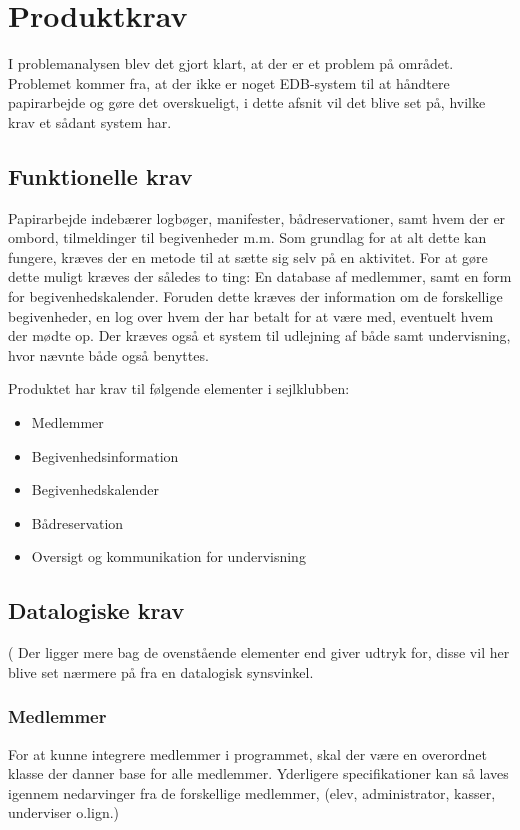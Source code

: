 \chapter{Produktkrav}
I problemanalysen blev det gjort klart, at der er et problem på området. Problemet kommer fra, at der ikke er noget EDB-system til at håndtere papirarbejde og gøre det overskueligt, i dette afsnit vil det blive set på, hvilke krav et sådant
system har.

\section{Funktionelle krav} \label{sec:funktionelleKrav}
Papirarbejde indebærer logbøger, manifester, bådreservationer, samt hvem der er ombord, tilmeldinger til begivenheder m.m.
Som grundlag for at alt dette kan fungere, kræves der en metode til at sætte sig selv på en aktivitet. For at gøre dette
muligt kræves der således to ting: En database af medlemmer, samt en form for begivenhedskalender. Foruden dette kræves
der information om de forskellige begivenheder, en log over hvem der har betalt for at være med, eventuelt hvem der
mødte op. Der kræves også et system til udlejning af både samt undervisning, hvor nævnte både også benyttes.

Produktet har krav til følgende elementer i sejlklubben:
\begin{itemize}
  \item Medlemmer
  \item Begivenhedsinformation
  \item Begivenhedskalender
  \item Bådreservation
  \item Oversigt og kommunikation for undervisning
\end{itemize}

\section{Datalogiske krav}(
Der ligger mere bag de ovenstående elementer end  giver udtryk for, disse vil her blive set nærmere på fra en datalogisk synsvinkel.
\subsection{Medlemmer}
For at kunne integrere medlemmer i programmet, skal der være en overordnet klasse der danner base for alle medlemmer. Yderligere specifikationer kan så laves igennem nedarvinger fra de forskellige medlemmer, (elev, administrator, kasser, underviser o.lign.)
